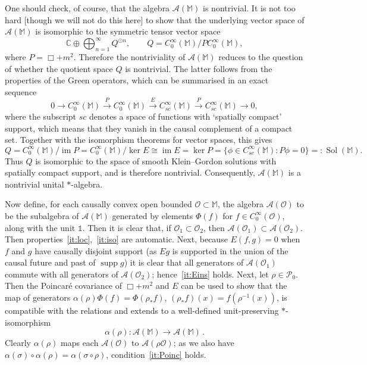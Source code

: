 \documentclass[12pt,a4paper]{article}
\newcommand{\1}{\mathds{1}}                         %
\newcommand{\CC}{\mathbb{C}}           %
\newcommand{\Ocal}{\mathcal{O}}
\newcommand{\MM}{\mathbb{M}}
\newcommand{\II}{{\mathbb{1}}}
\newcommand{\Ac}{{\mathcal{A}}}
\newcommand{\Pc}{{\mathcal{P}}}
\newcommand{\CoinX}[1]{C_0^\infty(#1)}
\DeclareMathOperator{\im}{im}
\DeclareMathOperator{\supp}{supp}
\DeclareMathOperator{\Sol}{Sol}
\begin{document}
	One should check, of course, that the algebra $\Ac(\MM)$ is nontrivial. It is not too hard [though we will not do this here] to show that the underlying vector space of $\Ac(\MM)$ is isomorphic to the symmetric tensor vector space
	\[
	\CC \oplus \bigoplus_{n=1}^\infty Q^{\odot n}, \qquad Q = \CoinX{\MM}/P \CoinX{\MM},
	\]
	where $P=\Box+m^2$. Therefore the nontriviality of $\Ac(\MM)$ reduces to the question of whether the quotient space $Q$ is nontrivial. 
	The latter follows from the properties of the Green operators, which can be summarised in an exact sequence~\cite{BarGinouxPfaffle}
	\begin{equation}\label{eq:exactsequence}
	0 \longrightarrow \CoinX{\MM}\stackrel{P}{\longrightarrow}  \CoinX{\MM} \stackrel{E}{\longrightarrow}
	C^\infty_{\textit{sc}} (\MM) \stackrel{P}{\longrightarrow}C^\infty_{\textit{sc}} (\MM) \longrightarrow 0,
	\end{equation} 
	where the subscript $sc$ denotes a space of functions with `spatially compact' support, which means that they vanish in the causal complement of a compact set. Together with the isomorphism theorems for vector spaces, this gives
	\begin{equation}
	Q =\CoinX{\MM}/\im P = \CoinX{\MM}/\ker E \cong \im E = \ker P =\{\phi\in C^\infty_{\textit{sc}} (\MM): P\phi=0\}=:\Sol(\MM).
	\end{equation}
	Thus $Q$ is isomorphic to the space of smooth Klein--Gordon solutions with spatially compact support, and is therefore nontrivial. Consequently, $\Ac(\MM)$ is a nontrivial unital $*$-algebra.
	
	Now define, for each causally convex open bounded $\Ocal\subset\MM$, the algebra $\Ac(\Ocal)$ to be the subalgebra of $\Ac(\MM)$ generated by elements $\Phi(f)$ for $f\in\CoinX{\Ocal}$, along with the unit $\II$. 
	Then it is clear that, if $\Ocal_1\subset \Ocal_2$, then $\Ac(\Ocal_1)\subset \Ac(\Ocal_2)$. Then properties~\ref{it:loc},~\ref{it:iso} are automatic.
	Next, because $E(f,g)=0$ when $f$ and $g$ have causally disjoint support (as $Eg$ is supported in the union of the causal future and past of $\supp g$) it is clear that all generators of $\Ac(\Ocal_1)$ commute with all generators of $\Ac(\Ocal_2)$; hence~\ref{it:Eins} holds. Next, let $\rho\in\Pc_0$. Then the Poincar\'e covariance of $\Box+m^2$ and $E$ can be used to show that
	the map of generators $\alpha(\rho)\Phi(f) = \Phi(\rho_* f)$, $(\rho_*f)(x)=f(\rho^{-1}(x))$, is compatible with the relations and extends to a well-defined unit-preserving $*$-isomorphism
	\begin{equation}
	\alpha(\rho):\Ac(\MM)\to\Ac(\MM)\,.
	\end{equation}
	Clearly $\alpha(\rho)$ maps each $\Ac(\Ocal)$ to $\Ac(\rho\Ocal)$; as we also have $\alpha(\sigma)\circ\alpha(\rho)=\alpha(\sigma\circ\rho)$,  condition~\ref{it:Poinc} holds. 
	
\end{document}

